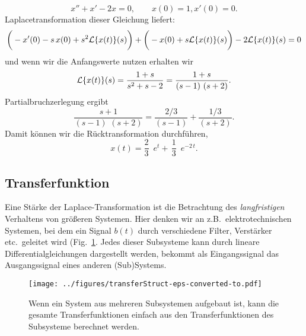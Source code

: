 \begin{bspX}
$$x'' + x' - 2 x  = 0,\qquad x(0)=1, x'(0)=0.$$
Laplacetransformation dieser Gleichung liefert:
$$ \bigg(-x'(0)-s\, x(0) + s^2 {\cal L}\{x(t)\}(s)\bigg)
+
\bigg(-x(0) + s {\cal L}\{x(t)\}(s)\bigg)
- 2 
{\cal L}\{x(t)\}(s)  =0$$
und wenn wir die Anfangswerte nutzen erhalten wir
$${\cal L}\{x(t)\}(s) 
= \frac{1+s}{s^2+s-2}
= \frac{1+s}{(s-1)\,\,(s+2)}.
$$
Partialbruchzerlegung ergibt
$$
 \frac{s+1}{(s-1)\,\,(s+2)}
= \frac{2/3}{(s-1)}+\frac{1/3}{(s+2)}.
$$
Damit k\"onnen wir die R\"ucktransformation durchf\"uhren,
$$x(t) = \frac 2 3\,\,\,  e^{t}    +\,\frac  1 3\,\,\,   e^{-2\, t}.$$ 
\end{bspX}


\begin{auf}\chc\label{lpaplaceAuf11}

\end{auf}


\begin{auf}\chb\label{lpaplaceAuf12}

\end{auf}



\subsection{Transferfunktion}


Eine St\"arke der Laplace-Transformation ist die Betrachtung des {\it langfristigen} 
Verhaltens von gr\"o\ss{}eren Systemen. Hier denken wir an z.B.\ 
elektrotechnischen Systemen, bei dem ein Signal $b(t)$ durch verschiedene 
Filter, Verst\"arker etc.\ geleitet wird (Fig.~\ref{systTrans}. 
Jedes dieser Subsysteme kann durch 
lineare Differentialgleichungen dargestellt werden, bekommt als Eingangssignal 
das Ausgangssignal eines anderen (Sub)Systems. 

\begin{figure}[htb]
\begin{center}
\texttt{[image: ../figures/transferStruct-eps-converted-to.pdf]}
\end{center}
\caption{Wenn ein System aus mehreren Subsystemen aufgebaut ist, kann die 
gesamte Transferfunktionen einfach aus den Transferfunktionen des Subsysteme berechnet werden.}
\label{systTrans}
\end{figure}


